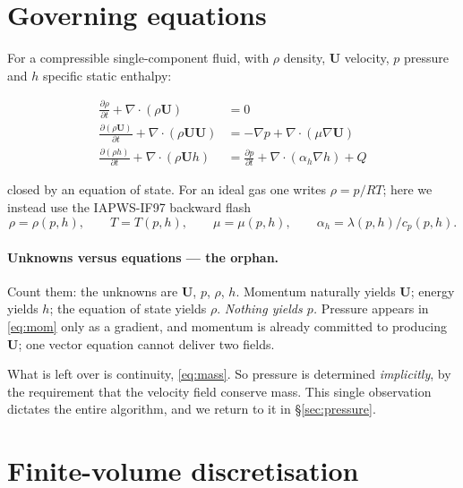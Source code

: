 \documentclass[11pt,a4paper]{article}
\newcommand{\uvec}{\mathbf{U}}
\begin{document}
\section{Governing equations}\label{sec:governing}

For a compressible single-component fluid, with $\rho$ density, $\uvec$
velocity, $p$ pressure and $h$ specific static enthalpy:

\begin{align}
  \frac{\partial \rho}{\partial t} + \nabla\!\cdot\!(\rho \uvec) &= 0
  \label{eq:mass}\\[2pt]
  \frac{\partial (\rho \uvec)}{\partial t} + \nabla\!\cdot\!(\rho \uvec \uvec)
    &= -\nabla p + \nabla\!\cdot\!(\mu \nabla \uvec)
  \label{eq:mom}\\[2pt]
  \frac{\partial (\rho h)}{\partial t} + \nabla\!\cdot\!(\rho \uvec h)
    &= \frac{\partial p}{\partial t} + \nabla\!\cdot\!(\alpha_h \nabla h) + Q
  \label{eq:energy}
\end{align}

closed by an equation of state. For an ideal gas one writes $\rho = p/RT$; here
we instead use the IAPWS-IF97 backward flash
\begin{equation}
  \rho = \rho(p,h), \qquad T = T(p,h), \qquad \mu = \mu(p,h),
  \qquad \alpha_h = \lambda(p,h)/c_p(p,h).
  \label{eq:eos}
\end{equation}

\paragraph{Unknowns versus equations --- the orphan.} Count them: the unknowns
are $\uvec$, $p$, $\rho$, $h$. Momentum naturally yields $\uvec$; energy yields
$h$; the equation of state yields $\rho$. \emph{Nothing yields $p$.} Pressure
appears in \eqref{eq:mom} only as a gradient, and momentum is already committed
to producing $\uvec$; one vector equation cannot deliver two fields.

What is left over is continuity, \eqref{eq:mass}. So pressure is determined
\emph{implicitly}, by the requirement that the velocity field conserve mass.
This single observation dictates the entire algorithm, and we return to it in
\S\ref{sec:pressure}.

\section{Finite-volume discretisation}\label{sec:fv}
\end{document}
